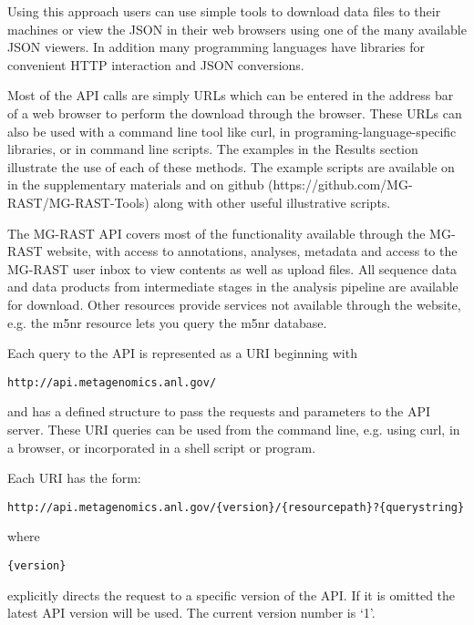 Using this approach users can use simple tools to download data files to their machines or view the JSON in their web browsers using one of the many available JSON viewers. In addition many programming languages have libraries for convenient HTTP interaction and JSON conversions. 

Most of the API calls are simply URLs which can be entered in the address bar of a web browser to perform the download through the browser. These URLs can also be used with a command line tool like curl, in programing-language-specific libraries, or in command line scripts. The examples in the Results section illustrate the use of each of these methods. The example scripts are available on in the supplementary materials and on github (https://github.com/MG-RAST/MG-RAST-Tools) along with other useful illustrative scripts.

The MG-RAST API covers most of the functionality available through the MG-RAST website, with access to annotations, analyses, metadata and access to the MG-RAST user inbox to view contents as well as upload files. All sequence data and data products from intermediate stages in the analysis pipeline are available for download. Other resources provide services not available through the website, e.g. the m5nr resource lets you query the m5nr database.

Each query to the API is represented as a URI beginning with 
\begin{small}
\begin{verbatim}
http://api.metagenomics.anl.gov/
\end{verbatim}
\end{small} and has a defined structure to pass the requests and parameters to the API server. These URI queries can be used from the command line, e.g. using curl, in a browser, or incorporated in a shell script or program.

Each URI has the form:
\begin{small}
\begin{verbatim}
http://api.metagenomics.anl.gov/{version}/{resourcepath}?{querystring}
\end{verbatim}
\end{small} where

\begin{small}
\begin{verbatim}
{version}
\end{verbatim}
\end{small}
explicitly directs the request to a specific version of the API. If it is omitted the latest API version will be used. The current version number is `1'.

